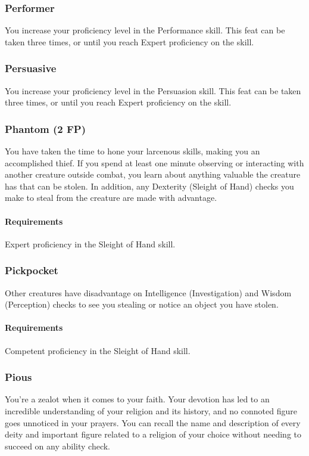 \subsubsection{Performer} \label{feat::performer}
    You increase your proficiency level in the Performance skill.
    This feat can be taken three times, or until you reach Expert proficiency on the skill.
\subsubsection{Persuasive} \label{feat::persuasive}
    You increase your proficiency level in the Persuasion skill.
    This feat can be taken three times, or until you reach Expert proficiency on the skill.
\subsubsection{Phantom (2 FP)} \label{feat::phantom} %
    You have taken the time to hone your larcenous skills, making you an accomplished thief.
    If you spend at least one minute observing or interacting with another creature outside combat, you learn about anything valuable the creature has that can be stolen.
    In addition, any Dexterity (Sleight of Hand) checks you make to steal from the creature are made with advantage.
    \paragraph{Requirements} Expert proficiency in the Sleight of Hand skill.
\subsubsection{Pickpocket} \label{feat::pickpocket}
    Other creatures have disadvantage on Intelligence (Investigation) and Wisdom (Perception) checks to see you stealing or notice an object you have stolen.
    \paragraph{Requirements} Competent proficiency in the Sleight of Hand skill.
\subsubsection{Pious} \label{feat::pious}
    You're a zealot when it comes to your faith.
    Your devotion has led to an incredible understanding of your religion and its history, and no connoted figure goes unnoticed in your prayers.
    You can recall the name and description of every deity and important figure related to a religion of your choice without needing to succeed on any ability check.


